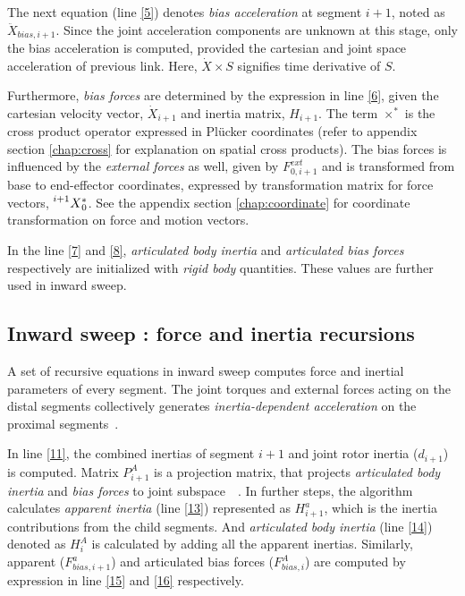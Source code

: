 The next equation (line \ref{5}) denotes \textit{bias acceleration} at segment $i+1$, noted as $\ddot{X}_{bias, i+1}$. Since the joint acceleration components are unknown at this stage, only the bias acceleration is computed, provided the cartesian and joint space acceleration of previous link. Here, $\dot{X} \times S$ signifies time derivative of $S$. 

Furthermore, \textit{bias forces} are determined by the expression in line \ref{6}, given the cartesian velocity vector, $\dot{X}_{i+1}$ and inertia matrix, $H_{i+1}$. The term $\times^*$ is the cross product operator expressed in Pl{\"u}cker coordinates (refer to appendix section \ref{chap:cross} for explanation on spatial cross products). The bias forces is influenced by the \textit{external forces} as well, given by $F^{ext}_{0, i+1}$ and is transformed from base to end-effector coordinates, expressed by transformation matrix for force vectors, $\prescript{i+1}{}{X}_0^*$. See the appendix section \ref{chap:coordinate} for coordinate transformation on force and motion vectors.

In the line \ref{7} and \ref{8}, \textit{articulated body inertia} and \textit{articulated bias forces} respectively are initialized with \textit{rigid body} quantities. These values are further used in inward sweep.

\subsection{Inward sweep : force and inertia recursions}

A set of recursive equations in inward sweep computes force and inertial parameters of every segment. The joint torques and external forces acting on the distal segments collectively generates \textit{inertia-dependent acceleration} on the proximal segments~\cite{shakhimardanov2015composable}.


In line \ref{11}, the combined inertias of segment $i+1$ and joint rotor inertia ($d_{i+1}$) is computed. Matrix $P^A_{i+1}$ is a projection matrix, that projects \textit{articulated body inertia} and \textit{bias forces} to joint subspace~\cite{shakhimardanov2015composable}~\cite{vukcevic2018extending}. In further steps, the algorithm calculates \textit{apparent inertia} (line \ref{13}) represented as $H^a_{i+1}$, which is the inertia contributions from the child segments. And \textit{articulated body inertia} (line \ref{14}) denoted as $H^A_{i}$ is calculated by adding all the apparent inertias. Similarly, apparent ($F^a_{bias, i+1}$) and articulated bias forces ($F^A_{bias, i}$) are computed by expression in line \ref{15} and \ref{16} respectively.

